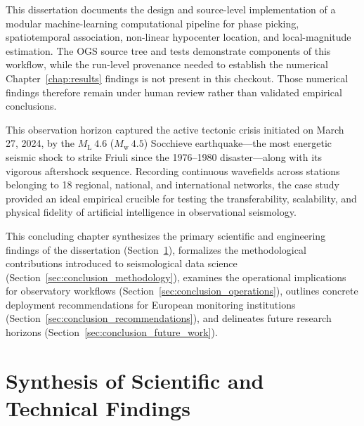 
\label{chap:conclusion}

This dissertation documents the design and source-level implementation of a
modular machine-learning computational pipeline for phase picking,
spatiotemporal association, non-linear hypocenter location, and
local-magnitude estimation. The \ac{OGS} source tree and tests demonstrate
components of this workflow, while the run-level provenance needed to establish
the numerical Chapter~\ref{chap:results} findings is not present in this
checkout.
Those numerical findings therefore remain under human review rather
than validated empirical conclusions.

This observation horizon captured the active tectonic crisis
initiated on March 27, 2024, by the $M_{\mathrm{L}}~4.6$
($M_{\mathrm{w}}~4.5$) Socchieve earthquake---the most energetic
seismic shock to strike Friuli since the 1976--1980 disaster---along
with its vigorous aftershock sequence. Recording continuous
wavefields across  stations belonging to
18 regional, national,
and international networks, the case study provided an ideal
empirical crucible for testing the transferability, scalability, and
physical fidelity of artificial intelligence in observational seismology.

This concluding chapter synthesizes the primary scientific and
engineering findings of the dissertation
(Section~\ref{sec:conclusion_findings}), formalizes the
methodological contributions introduced to seismological data
science (Section~\ref{sec:conclusion_methodology}), examines the
operational implications for observatory workflows
(Section~\ref{sec:conclusion_operations}), outlines concrete
deployment recommendations for European monitoring institutions
(Section~\ref{sec:conclusion_recommendations}), and delineates
future research horizons (Section~\ref{sec:conclusion_future_work}).

\section{Synthesis of Scientific and Technical Findings}
\label{sec:conclusion_findings}

